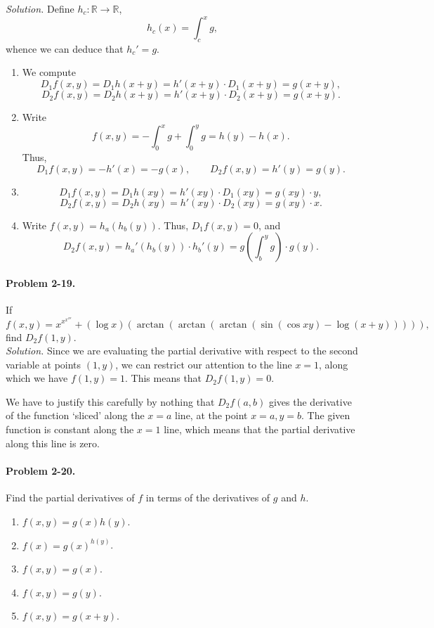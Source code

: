 \documentclass[11pt]{report}
\newcommand{\R}{\mathbb{R}}
\newcommand{\problem}[1]{\paragraph{Problem #1.}}
\newcommand{\solution}{\noindent\textit{Solution.} }
\begin{document}
    \solution Define $h_c\colon \R \to \R$, \[
        h_c(x) = \int_c^x g,
    \] whence we can deduce that $h_c' = g$. 
    \begin{enumerate}
        \item We compute \[
            D_1f(x, y) = D_1h(x + y) = h'(x + y) \cdot D_1(x + y) = g(x + y),
        \] \[
            D_2f(x, y) = D_2h(x + y) = h'(x + y) \cdot D_2(x + y) = g(x + y).
        \] 

        \item Write \[
            f(x, y) = -\int_0^x g + \int_0^y g = h(y) - h(x).
        \] Thus, \[
            D_1f(x, y) = -h'(x) = -g(x), \qquad
            D_2f(x, y) = h'(y) = g(y).
        \] 

        \item \[
            D_1f(x, y) = D_1h(xy) = h'(xy)\cdot D_1(xy) = g(xy)\cdot y,
        \] \[
            D_2f(x, y) = D_2h(xy) = h'(xy)\cdot D_2(xy) = g(xy)\cdot x.
        \] 

        \item Write $f(x, y) = h_a(h_b(y))$. Thus, $D_1f(x, y) = 0$, and \[
            D_2f(x, y) = h_a'(h_b(y))\cdot h_b'(y) = g\left(\int_b^y g\right)\cdot
            g(y).
        \] 
    \end{enumerate}


    \problem{2-19} If \[
        f(x, y) = x^{x^{x^{x^y}}} + (\log{x})(\arctan(\arctan(\arctan(\sin(\cos{xy})
        - \log(x + y))))),
    \] find $D_2f(1, y)$. \\

    \solution Since we are evaluating the partial derivative with respect to the
    second variable at points $(1, y)$, we can restrict our attention to the line $x
    = 1$, along which we have $f(1, y) = 1$. This means that $D_2f(1, y) = 0$.

    We have to justify this carefully by nothing that $D_2f(a, b)$ gives the
    derivative of the function `sliced' along the $x = a$ line, at the point $x = a,
    y = b$. The given function is constant along the $x = 1$ line, which means that
    the partial derivative along this line is zero.


    \problem{2-20} Find the partial derivatives of $f$ in terms of the derivatives of
    $g$ and $h$.
    \begin{enumerate}
        \itemsep0em
        \item $f(x, y) = g(x) h(y)$.
        \item $f(x) = g(x)^{h(y)}$.
        \item $f(x, y) = g(x)$.
        \item $f(x, y) = g(y)$.
        \item $f(x, y) = g(x + y)$.
    \end{enumerate}
\end{document}
